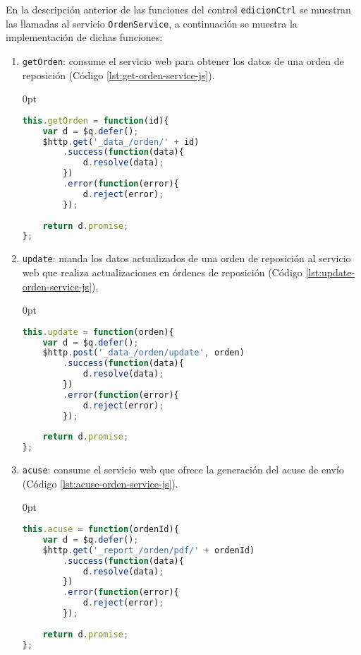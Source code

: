 \begin{enumerate}
\begin{enumerate}
\end{enumerate}

En la descripción anterior de las funciones del control \texttt{edicionCtrl} se muestran las llamadas al servicio \texttt{OrdenService}, a continuación se muestra la implementación de dichas funciones:

\begin{enumerate}
	\item \texttt{getOrden}: consume el servicio web para obtener los datos de una orden de reposición (Código \ref{lst:get-orden-service-js}).
\begin{adjustwidth}{\listingfixlargewidth}{0pt}
\begin{lstlisting}[language=Javascript, caption={Función para consumir el servicio web que obtiene los datos de una orden de reposición.}, captionpos=b, label={lst:get-orden-service-js}]
this.getOrden = function(id){
	var d = $q.defer();
	$http.get('_data_/orden/' + id)
		.success(function(data){
			d.resolve(data);
		})
		.error(function(error){
			d.reject(error);
		});
	
	return d.promise;
};
\end{lstlisting}
\end{adjustwidth}

	\item \texttt{update}: manda los datos actualizados de una orden de reposición al servicio web que realiza actualizaciones en órdenes de reposición (Código \ref{lst:update-orden-service-js}).
\begin{adjustwidth}{\listingfixlargewidth}{0pt}
\begin{lstlisting}[language=Javascript, caption={Función para actualizar los datos de una orden de reposición.}, captionpos=b, label={lst:update-orden-service-js}]
this.update = function(orden){
	var d = $q.defer();
	$http.post('_data_/orden/update', orden)
		.success(function(data){
			d.resolve(data);
		})
		.error(function(error){
			d.reject(error);
		});
	
	return d.promise;
};
\end{lstlisting}
\end{adjustwidth}

	\item \texttt{acuse}: consume el servicio web que ofrece la generación del acuse de envío (Código \ref{lst:acuse-orden-service-js}).
\begin{adjustwidth}{\listingfixlargewidth}{0pt}
\begin{lstlisting}[language=Javascript, caption={Función para mandar la generación del acuse de envío de una orden de reposición.}, captionpos=b, label={lst:acuse-orden-service-js}]
this.acuse = function(ordenId){
	var d = $q.defer();
	$http.get('_report_/orden/pdf/' + ordenId)
		.success(function(data){
			d.resolve(data);
		})
		.error(function(error){
			d.reject(error);
		});
	
	return d.promise;
};
\end{lstlisting}
\end{adjustwidth}

\end{enumerate}
\end{enumerate}

